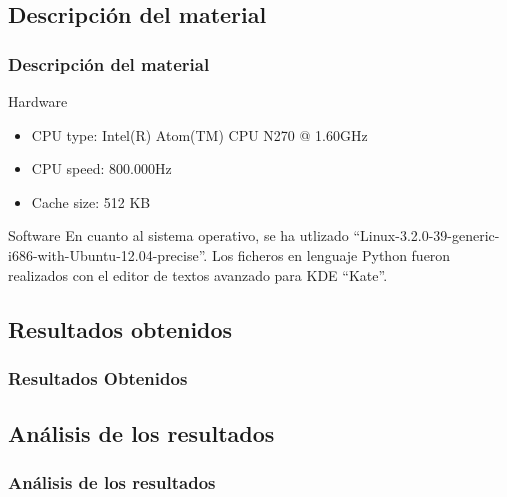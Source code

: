 \documentclass{beamer}
\begin{document}
\subsection{Descripción del material}
\begin{frame}
\frametitle{Descripción del material}

\begin{block}{Hardware}
  \begin{itemize}
  \item CPU type: Intel(R) Atom(TM) CPU N270   @ 1.60GHz
  \item CPU speed: 800.000Hz
  \item Cache size: 512 KB
  \end{itemize}
\end{block}

\begin{block}{Software}
En cuanto al sistema operativo, se ha utlizado ``Linux-3.2.0-39-generic-i686-with-Ubuntu-12.04-precise''.
Los ficheros en lenguaje Python fueron realizados con el editor de textos avanzado para KDE ``Kate''.
\end{block}

\end{frame}

\subsection{Resultados obtenidos}
\begin{frame}
\frametitle{Resultados Obtenidos}




\end{frame}


\subsection{Análisis de los resultados}
\begin{frame}
\frametitle{Análisis de los resultados}




\end{frame}
\end{document}
